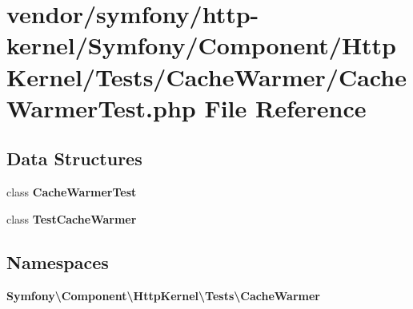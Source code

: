 \section{vendor/symfony/http-\/kernel/\+Symfony/\+Component/\+Http\+Kernel/\+Tests/\+Cache\+Warmer/\+Cache\+Warmer\+Test.php File Reference}
\label{_cache_warmer_test_8php}
\subsection*{Data Structures}
\begin{DoxyCompactItemize}
\item 
class {\bf Cache\+Warmer\+Test}
\item 
class {\bf Test\+Cache\+Warmer}
\end{DoxyCompactItemize}
\subsection*{Namespaces}
\begin{DoxyCompactItemize}
\item 
 {\bf Symfony\textbackslash{}\+Component\textbackslash{}\+Http\+Kernel\textbackslash{}\+Tests\textbackslash{}\+Cache\+Warmer}
\end{DoxyCompactItemize}
